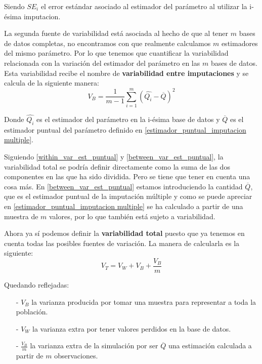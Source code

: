\documentclass[a4paper,openright,12pt]{report}
\begin{document}
Siendo $SE_{i}$ el error estándar asociado al estimador del parámetro al utilizar la i-ésima imputacion.

La segunda fuente de variabilidad está asociada al hecho de que al tener $m$ bases de datos completas, no encontramos con que realmente calculamos $m$ estimadores del mismo parámetro. Por lo que tenemos que cuantificar la variabilidad relacionada con la variación del estimador del parámetro en las $m$ bases de datos. Esta variabilidad recibe el nombre de \textbf{variabilidad entre imputaciones} y se calcula de la siguiente manera:
\begin{equation}
V_{B}=\frac{1}{m-1}\sum_{i=1}^{m}(\widehat{Q_{i}}-\overline{Q})^{2}
\label{between_var_est_puntual}
\end{equation}

Donde $\widehat{Q_{i}}$ es el estimador del parámetro en la i-ésima base de datos y $\overline{Q}$ es el estimador puntual del parámetro definido en \ref{estimador_puntual_imputacion multiple}.

Siguiendo \ref{within_var_est_puntual} y \ref{between_var_est_puntual}, la variabilidad total se podría definir directamente como la suma de las dos componentes en las que ha sido dividida. Pero se tiene que tener en cuenta una cosa más. En \ref{between_var_est_puntual} estamos introduciendo la cantidad $\overline{Q}$, que es el estimador puntual de la imputación múltiple y como se puede apreciar en \ref{estimador_puntual_imputacion multiple} se ha calculado a partir de una muestra de $m$ valores, por lo que también está sujeto a variabilidad.

Ahora ya sí podemos definir la \textbf{variabilidad total} puesto que ya tenemos en cuenta todas las posibles fuentes de variación. La manera de calcularla es la siguiente:
\begin{equation}
V_{T} = V_{W} + V_{B} + \frac{V_{B}}{m}
\label{total_var_est_puntual}
\end{equation}

Quedando reflejadas:
\begin{itemize}
\item[-] $V_{B}$ la varianza producida por tomar una muestra para representar a toda la población.
\item[-] $V_{W}$ la varianza extra por tener valores perdidos en la base de datos.
\item[-] $\frac{V_{B}}{m}$ la varianza extra de la simulación por ser $\overline{Q}$ una estimación calculada a partir de $m$ observaciones.
\end{itemize}
\end{document}
